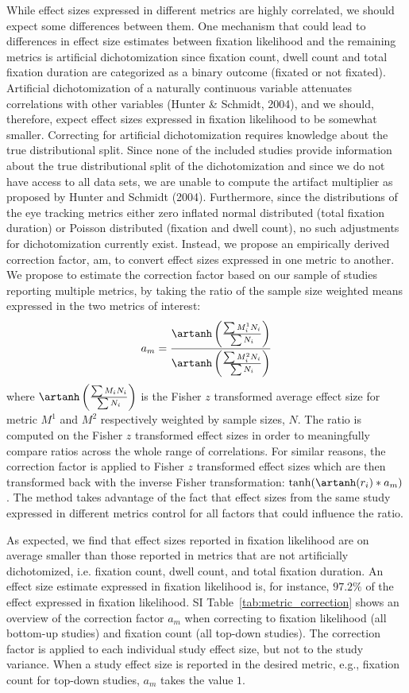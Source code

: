 \documentclass{article}
\begin{document}
While effect sizes expressed in different metrics are highly correlated, we should expect some differences between them. One mechanism that could lead to differences in effect size estimates between fixation likelihood and the remaining metrics is artificial dichotomization since fixation count, dwell count and total fixation duration are categorized as a binary outcome (fixated or not fixated). Artificial dichotomization of a naturally continuous variable attenuates correlations with other variables (Hunter \& Schmidt, 2004), and we should, therefore, expect effect sizes expressed in fixation likelihood to be somewhat smaller. Correcting for artificial dichotomization requires knowledge about the true distributional split. Since none of the included studies provide information about the true distributional split of the dichotomization and since we do not have access to all data sets, we are unable to compute the artifact multiplier as proposed by Hunter and Schmidt (2004). Furthermore, since the distributions of the eye tracking metrics either zero inflated normal distributed (total fixation duration) or Poisson distributed (fixation and dwell count), no such adjustments for dichotomization currently exist. Instead, we propose an empirically derived correction factor, am, to convert effect sizes expressed in one metric to another. We propose to estimate the correction factor based on our sample of studies reporting multiple metrics, by taking the ratio of the sample size weighted means expressed in the two metrics of interest:
%
\begin{equation}
\label{eq:metrics_correction}
a_m = \frac{\artanh \left( \frac{\sum M_i^1 N_i}{\sum N_i} \right)}{\artanh \left( \frac{\sum M_i^2 N_i}{\sum N_i} \right)}
\end{equation}
%
where $\artanh \left( \frac{\sum M_i N_i}{\sum N_i} \right)$ is the Fisher $z$ transformed average effect size for metric $M^1$ and $M^2$ respectively weighted by sample sizes, $N$. The ratio is computed on the Fisher $z$ transformed effect sizes in order to meaningfully compare ratios across the whole range of correlations. For similar reasons, the correction factor is applied to Fisher $z$ transformed effect sizes which are then transformed back with the inverse Fisher transformation: $\tanh(\artanh(r_i)*a_m)$. The method takes advantage of the fact that effect sizes from the same study expressed in different metrics control for all factors that could influence the ratio.    

As expected, we find that effect sizes reported in fixation likelihood are on average smaller than those reported in metrics that are not artificially dichotomized, i.e. fixation count, dwell count, and total fixation duration. An effect size estimate expressed in fixation likelihood is, for instance, $97.2\%$ of the effect expressed in fixation likelihood. SI Table~\ref{tab:metric_correction} shows an overview of the correction factor $a_m$ when correcting to fixation likelihood (all bottom-up studies) and fixation count (all top-down studies). The correction factor is applied to each individual study effect size, but not to the study variance. When a study effect size is reported in the desired metric, e.g., fixation count for top-down studies, $a_m$ takes the value $1$.  
\end{document}
